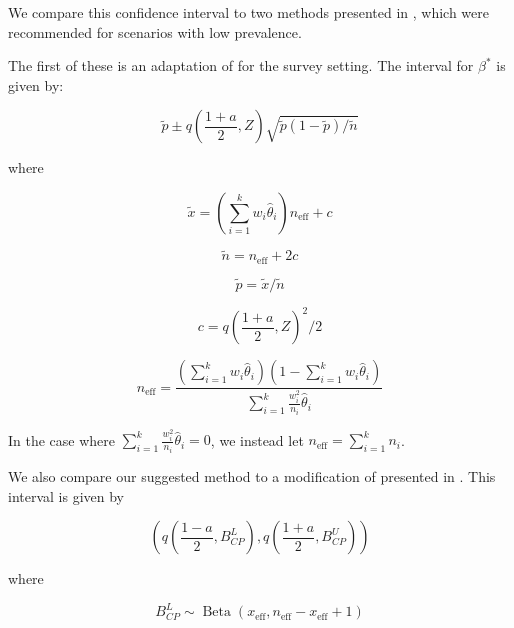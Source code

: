 \documentclass[AMA,STIX1COL]{WileyNJD-v2}
\begin{document}
We compare this confidence interval to two methods presented in \cite{Dean:2015}, which were recommended for scenarios with low prevalence.

The first of these is an adaptation of \cite{AgrestiCoull} for the survey setting.
The interval for \( \beta^* \) is given by:

\begin{equation}
    \tilde{p} \pm q\left( \frac{1 + a}{2}, Z \right) \sqrt{\tilde{p}(1 - \tilde{p}) / \tilde{n}}
\end{equation}

where 

\begin{equation}
   \tilde{x} = \left( \sum_{i=1}^k w_i \hat{\theta}_i \right) n_{\text{eff}} + c 
\end{equation}

\begin{equation}
   \tilde{n} = n_{\text{eff}} + 2c 
\end{equation}

\begin{equation}
    \tilde{p} = \tilde{x} / \tilde{n}
\end{equation}

\begin{equation}
   c = q\left( \frac{1 + a}{2}, Z \right)^2/2 
\end{equation}

\begin{equation}
   n_{\text{eff}} = \frac{\left( \sum_{i=1}^k w_i \hat{\theta}_i \right) \left(1 - \sum_{i=1}^k w_i \hat{\theta}_i \right)}{\sum_{i=1}^k \frac{w_i^2}{n_i}\hat{\theta}_i} 
   \label{eq:neff}
\end{equation}
 
In the case where \( \sum_{i=1}^k \frac{w_i^2}{n_i}\hat{\theta}_i = 0 \), we instead let \( n_{\text{eff}} = \sum_{i=1}^k n_i \).

We also compare our suggested method to a modification of \cite{Korn:1998} presented in \cite{Dean:2015}.
This interval is given by 

\begin{equation}
    \left( q \left( \frac{1 - a}{2}, B^L_{CP} \right), q \left( \frac{1 + a}{2}, B^U_{CP} \right)  \right)
\end{equation}

where 

\begin{equation}
    B^L_{CP} \sim \operatorname{Beta}\left(x_{\text{eff}},  n_{\text{eff}} -  x_{\text{eff}} + 1 \right)
\end{equation}
\end{document}
